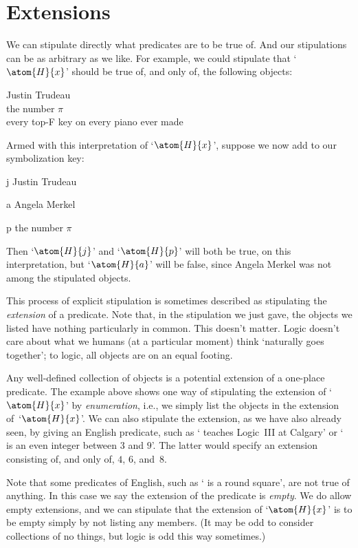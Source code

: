 \section{Extensions}\label{sec:extensions}
We can stipulate directly what predicates are to be true of. And our stipulations can be as arbitrary as we like. For example, we could stipulate that `$\atom{H}{x}$' should be true of, and only of, the following objects:
	\begin{center}
		Justin Trudeau\\
		the number $\pi$\\
		every top-F key on every piano ever made
	\end{center}
Armed with this interpretation of `$\atom{H}{x}$', suppose we now add to our symbolization key:
	\begin{ekey}
		\item[j] Justin Trudeau
		\item[a] Angela Merkel
		\item[p] the number $\pi$
	\end{ekey}
Then `$\atom{H}{j}$' and `$\atom{H}{p}$' will both be true, on this interpretation, but `$\atom{H}{a}$' will be false, since Angela Merkel was not among the stipulated objects.

This process of explicit stipulation is sometimes described as stipulating the \emph{extension} of a predicate. Note that, in the stipulation we just gave, the objects we listed have nothing particularly in common. This doesn't matter. Logic doesn't care about what we humans (at a particular moment) think `naturally goes together'; to logic, all objects are on an equal footing.

Any well-defined collection of objects is a potential extension of a one-place predicate.  The example above shows one way of stipulating the extension of `$\atom{H}{x}$' by \emph{enumeration}, i.e., we simply list the objects in the extension of~`$\atom{H}{x}$'. We can also stipulate the extension, as we have also already seen, by giving an English predicate, such as ` teaches Logic~III at Calgary' or ` is an even integer between $3$ and $9$'. The latter would specify an extension consisting of, and only of, $4$, $6$, and~$8$.

Note that some predicates of English, such as ` is a round square', are not true of anything.  In this case we say the extension of the predicate is \emph{empty}.  We do allow empty extensions, and we can stipulate that the extension of `$\atom{H}{x}$' is to be empty simply by not listing any members. (It may be odd to consider collections of no things, but logic is odd this way sometimes.)



